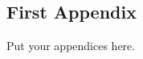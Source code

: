 \onecolumn

\appendix
\begin{appendices}

\section{First Appendix}
\label{sec:apx:first_appendix}

Put your appendices here.

\end{appendices}